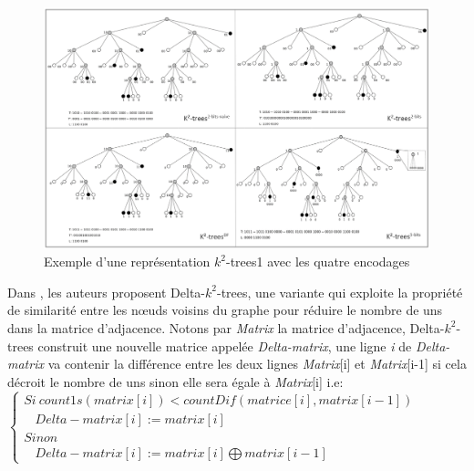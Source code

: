 \begin{figure}[H]
\begin{center}
\includegraphics[height=300 pt, width=450 pt]{./ressources/image/k2-trees1.png} 
\end{center}
\caption{Exemple d'une représentation $k^2$-trees1 avec les quatre encodages}
\label{k2-trees1-exemple}
\end{figure}



Dans \citep{zhang2014delta}, les auteurs proposent Delta-$k^2$-trees, une variante qui exploite la propriété de similarité entre les nœuds voisins du graphe pour réduire le nombre de uns dans la matrice d'adjacence. Notons par \textit{Matrix} la matrice d'adjacence, Delta-$k^2$-trees construit une nouvelle matrice appelée \textit{Delta-matrix}, une ligne \textit{i} de \textit{Delta-matrix} va contenir la différence entre les deux lignes \textit{Matrix}[i] et  \textit{Matrix}[i-1] si cela décroit le nombre de uns sinon elle sera égale à \textit{Matrix}[i] i.e: \\

$\left\{
\begin{array}{llcl}
Si\ count1s(matrix[i]) < countDif(matrice[i],matrix[i-1])\\
\ \ \ \ Delta-matrix[i]  := matrix[i]  \\
Sinon & & &\\
\ \ \ \ Delta-matrix[i]  := matrix[i] \bigoplus matrix[i-1] & 
\end{array}
\right.$\\

